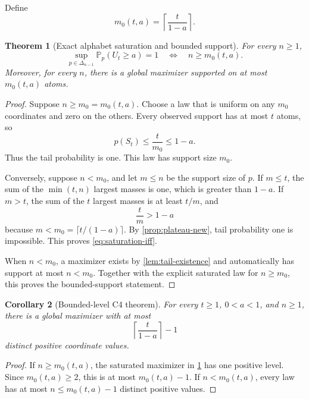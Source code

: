\documentclass[11pt]{article}
\theoremstyle{plain}
\newtheorem{theorem}{Theorem}[section]
\newtheorem{corollary}[theorem]{Corollary}
\theoremstyle{definition}
\theoremstyle{remark}
\newcommand{\PP}{\mathbb P}
\newcommand{\simplex}{\Delta_{n-1}}
\begin{document}
Define
\begin{equation}\label{eq:m0-def}
m_0(t,a)=\left\lceil\frac{t}{1-a}\right\rceil.
\end{equation}

\begin{theorem}[Exact alphabet saturation and bounded support]\label{thm:C4-support}
For every \(n\ge1\),
\begin{equation}\label{eq:saturation-iff}
\sup_{p\in\simplex}\PP_p(U_t\ge a)=1
\quad\Longleftrightarrow\quad
n\ge m_0(t,a).
\end{equation}
Moreover, for every \(n\), there is a global maximizer supported on at most \(m_0(t,a)\) atoms.
\end{theorem}

\begin{proof}
Suppose \(n\ge m_0=m_0(t,a)\).  Choose a law that is uniform on any \(m_0\) coordinates and zero on the others.  Every observed support has at most \(t\) atoms, so
\[
p(S_t)\le\frac{t}{m_0}\le1-a.
\]
Thus the tail probability is one.  This law has support size \(m_0\).

Conversely, suppose \(n<m_0\), and let \(m\le n\) be the support size of \(p\).  If \(m\le t\), the sum of the \(\min(t,n)\) largest masses is one, which is greater than \(1-a\).  If \(m>t\), the sum of the \(t\) largest masses is at least \(t/m\), and
\[
\frac{t}{m}>1-a
\]
because \(m<m_0=\lceil t/(1-a)\rceil\).  By \cref{prop:plateau-new}, tail probability one is impossible.  This proves \eqref{eq:saturation-iff}.

When \(n<m_0\), a maximizer exists by \cref{lem:tail-existence} and automatically has support at most \(n<m_0\).  Together with the explicit saturated law for \(n\ge m_0\), this proves the bounded-support statement.
\end{proof}

\begin{corollary}[Bounded-level C4 theorem]\label{cor:C4-level}
For every \(t\ge1\), \(0<a<1\), and \(n\ge1\), there is a global maximizer with at most
\begin{equation}\label{eq:C4-level-bound-new}
\left\lceil\frac{t}{1-a}\right\rceil-1
\end{equation}
distinct positive coordinate values.
\end{corollary}

\begin{proof}
If \(n\ge m_0(t,a)\), the saturated maximizer in \cref{thm:C4-support} has one positive level.  Since \(m_0(t,a)\ge2\), this is at most \(m_0(t,a)-1\).  If \(n<m_0(t,a)\), every law has at most \(n\le m_0(t,a)-1\) distinct positive values.
\end{proof}
\end{document}
